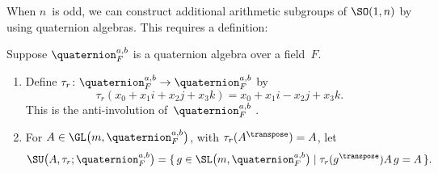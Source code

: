 %
%
%

When $n$~is odd, we can construct additional arithmetic subgroups of $\SO(1,n)$  by using quaternion algebras. This requires a definition:

\begin{defn} \label{SU(Quat)Defn}
 Suppose $\quaternion^{a,b}_F$ is a quaternion algebra over
a field~$F$.
\noprelistbreak
 \begin{enumerate}
 \item Define $\tau_r \colon \quaternion^{a,b}_F \to
\quaternion^{a,b}_F$ by 
 $$ \tau_r(x_0 + x_1 i + x_2 j + x_3 k)
 =  x_0 + x_1 i - x_2 j + x_3 k .$$
 This is the  anti-involution
of~$\quaternion^{a,b}_F$ .
 \item For $A \in \GL \bigl( m,\quaternion^{a,b}_F \bigr)$, with $\tau_r(A^\transpose) =
A$, let
 $$ \SU \bigl( A, \tau_r; \quaternion^{a,b}_F \bigr) =  \{\, g \in \SL \bigl( m,\quaternion^{a,b}_F \bigr) \mid
\tau_r(g^\transpose) A \, g = A \,\}.$$
 \end{enumerate}
 \end{defn}
 
